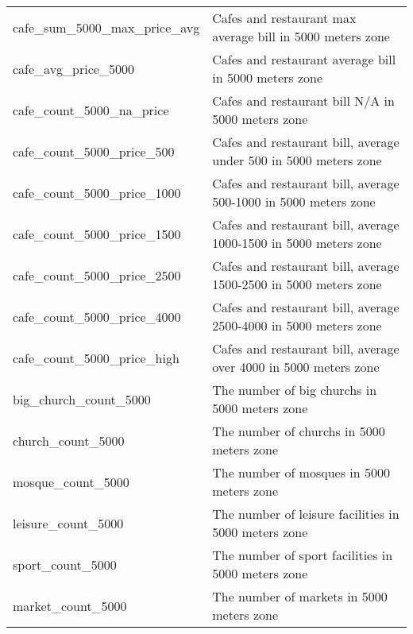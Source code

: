 \begin{longtable}[c]{ll}
    cafe\_sum\_5000\_max\_price\_avg           & Cafes and restaurant max average bill in 5000 meters zone                                                                 \\
    cafe\_avg\_price\_5000                     & Cafes and restaurant average bill in 5000 meters zone                                                                     \\
    cafe\_count\_5000\_na\_price               & Cafes and restaurant bill N/A in 5000 meters zone                                                                         \\
    cafe\_count\_5000\_price\_500              & Cafes and restaurant bill, average under 500 in 5000 meters zone                                                          \\
    cafe\_count\_5000\_price\_1000             & Cafes and restaurant bill, average  500-1000 in 5000 meters zone                                                          \\
    cafe\_count\_5000\_price\_1500             & Cafes and restaurant bill, average  1000-1500 in 5000 meters zone                                                         \\
    cafe\_count\_5000\_price\_2500             & Cafes and restaurant bill, average  1500-2500 in 5000 meters zone                                                         \\
    cafe\_count\_5000\_price\_4000             & Cafes and restaurant bill, average  2500-4000 in 5000 meters zone                                                         \\
    cafe\_count\_5000\_price\_high             & Cafes and restaurant bill, average  over 4000 in 5000 meters zone                                                         \\
    big\_church\_count\_5000                   & The number of big churchs in 5000 meters zone                                                                             \\
    church\_count\_5000                        & The number of churchs in 5000 meters zone                                                                                 \\
    mosque\_count\_5000                        & The number of mosques in 5000 meters zone                                                                                 \\
    leisure\_count\_5000                       & The number of leisure facilities in 5000 meters zone                                                                      \\
    sport\_count\_5000                         & The number of sport facilities in 5000 meters zone                                                                        \\
    market\_count\_5000                        & The number of markets in 5000 meters zone                                                                                 \\ \hline
    \end{longtable}
